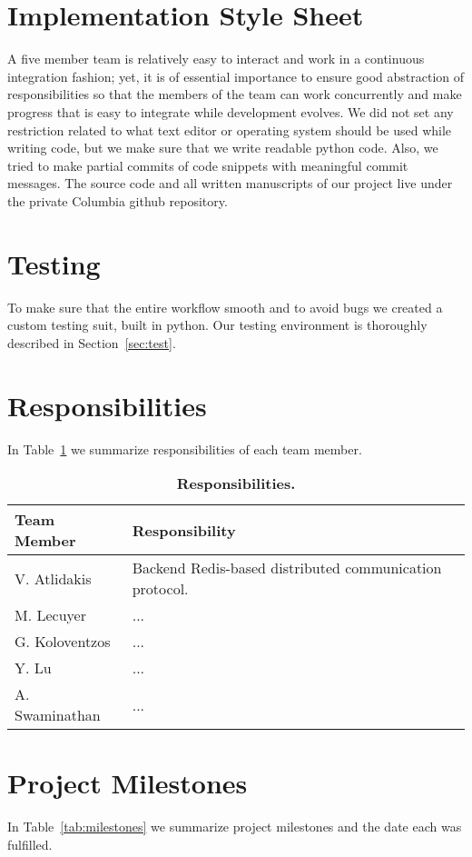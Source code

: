 \section{Implementation Style Sheet}
A five member team is relatively easy to interact and work in a continuous
integration fashion; yet, it is of essential importance to ensure good
abstraction of responsibilities so that the members of the team can work
concurrently and make progress that is easy to integrate while development
evolves. We did not set any restriction related to what text editor or
operating system  should be used while writing code, but we make sure that
we write readable python code. Also, we tried to make partial commits of
code snippets with meaningful commit messages. The source code and all written
manuscripts of our project live under the private Columbia github repository.

\section{Testing}
To make sure that the entire workflow smooth and to avoid bugs we created a
custom testing suit, built in python. Our testing environment is thoroughly
described in Section~\ref{sec:test}.

\section{Responsibilities}
In Table~\ref{tab:resp} we summarize responsibilities of each team member.
\begin{table}[!h]
{%
 \begin{center}
    \begin{tabular}{ | l || l |}
    \hline
    \textbf{Team Member} & \textbf{Responsibility} \\
    \hline
    \hline
    V. Atlidakis & Backend Redis-based distributed communication protocol.\\ \hline
    M. Lecuyer & ... \\ \hline
    G. Koloventzos & ... \\ \hline
    Y. Lu & ...  \\ \hline
    A. Swaminathan  &  ... \\ \hline
    \hline
    \end{tabular}
    \caption{\textbf{Responsibilities.}}
    \label{tab:resp}
 \end{center}
}
\end{table}

\section{Project Milestones}
In Table~\ref{tab:milestones}  we summarize project milestones and the date
each was fulfilled.

